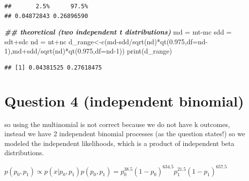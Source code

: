 \documentclass[
]{book}
\newenvironment{Shaded}{\begin{snugshade}}{\end{snugshade}}
\newcommand{\AttributeTok}[1]{\textcolor[rgb]{0.77,0.63,0.00}{#1}}
\newcommand{\DecValTok}[1]{\textcolor[rgb]{0.00,0.00,0.81}{#1}}
\newcommand{\DocumentationTok}[1]{\textcolor[rgb]{0.56,0.35,0.01}{\textbf{\textit{#1}}}}
\newcommand{\FloatTok}[1]{\textcolor[rgb]{0.00,0.00,0.81}{#1}}
\newcommand{\FunctionTok}[1]{\textcolor[rgb]{0.00,0.00,0.00}{#1}}
\newcommand{\NormalTok}[1]{#1}
\newcommand{\OtherTok}[1]{\textcolor[rgb]{0.56,0.35,0.01}{#1}}
\newcommand{\SpecialCharTok}[1]{\textcolor[rgb]{0.00,0.00,0.00}{#1}}
\theoremstyle{definition}
\theoremstyle{definition}
\theoremstyle{definition}
\theoremstyle{definition}
\theoremstyle{remark}
\begin{document}
\begin{verbatim}
##       2.5%      97.5% 
## 0.04872843 0.26896590
\end{verbatim}

\begin{Shaded}
\begin{Highlighting}[]
  \DocumentationTok{\#\# theoretical (two independent t distributions)}
\NormalTok{  md }\OtherTok{=}\NormalTok{ mt}\SpecialCharTok{{-}}\NormalTok{mc}
\NormalTok{  sdd }\OtherTok{=}\NormalTok{ sdt}\SpecialCharTok{+}\NormalTok{sdc}
\NormalTok{  nd }\OtherTok{=}\NormalTok{ nt}\SpecialCharTok{+}\NormalTok{nc}
\NormalTok{  d\_range}\OtherTok{\textless{}{-}}\FunctionTok{c}\NormalTok{(md}\SpecialCharTok{{-}}\NormalTok{sdd}\SpecialCharTok{/}\FunctionTok{sqrt}\NormalTok{(nd)}\SpecialCharTok{*}\FunctionTok{qt}\NormalTok{(}\FloatTok{0.975}\NormalTok{,}\AttributeTok{df=}\NormalTok{nd}\DecValTok{{-}1}\NormalTok{),md}\SpecialCharTok{+}\NormalTok{sdd}\SpecialCharTok{/}\FunctionTok{sqrt}\NormalTok{(nd)}\SpecialCharTok{*}\FunctionTok{qt}\NormalTok{(}\FloatTok{0.975}\NormalTok{,}\AttributeTok{df=}\NormalTok{nd}\DecValTok{{-}1}\NormalTok{))}
  \FunctionTok{print}\NormalTok{(d\_range)}
\end{Highlighting}
\end{Shaded}

\begin{verbatim}
## [1] 0.04381525 0.27618475
\end{verbatim}

\hypertarget{question-4-independent-binomial}{%
\section*{Question 4 (independent binomial)}\label{question-4-independent-binomial}}

so using the multinomial is not correct because we do not have k outcomes, instead we have 2 independent binomial processes (as the question states!) so we modeled the independent likelihoods, which is a product of independent beta distributions.

\(p(p_0,p_1) \propto p(x| p_0,p_1)p(p_0,p_1) = p_0^{38.5}(1-p_0)^{634.5}p_1^{21.5}(1-p_1)^{657.5}\)
\end{document}
